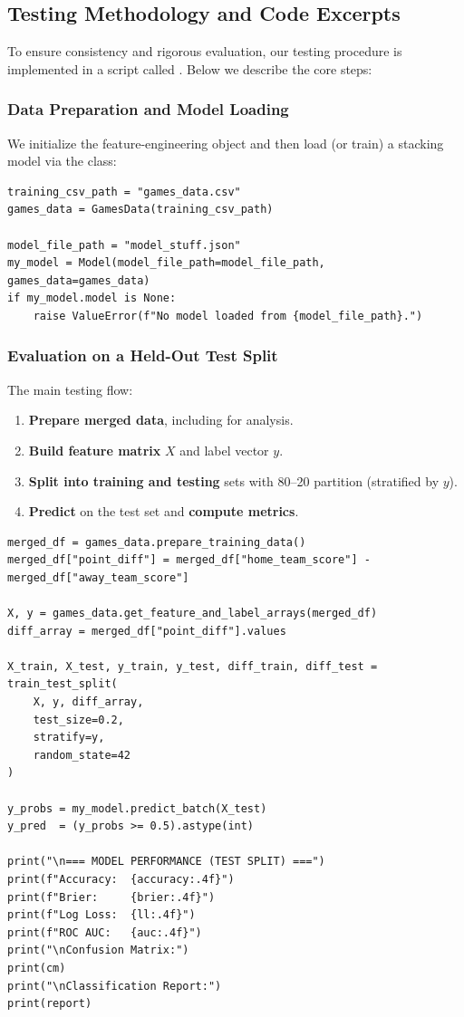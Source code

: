 \documentclass[12pt]{article}
\begin{document}
\subsection{Testing Methodology and Code Excerpts}
To ensure consistency and rigorous evaluation, our testing procedure is implemented in a script called . Below we describe the core steps:

\subsubsection{Data Preparation and Model Loading}
We initialize the feature-engineering object  and then load (or train) a stacking model via the  class:
\begin{verbatim}
training_csv_path = "games_data.csv"
games_data = GamesData(training_csv_path)

model_file_path = "model_stuff.json"
my_model = Model(model_file_path=model_file_path, games_data=games_data)
if my_model.model is None:
    raise ValueError(f"No model loaded from {model_file_path}.")
\end{verbatim}

\subsubsection{Evaluation on a Held-Out Test Split}
The main testing flow:
\begin{enumerate}[label=\arabic*)]
    \item \textbf{Prepare merged data}, including  for analysis.
    \item \textbf{Build feature matrix} \(X\) and label vector \(y\).
    \item \textbf{Split into training and testing} sets with 80--20 partition (stratified by \(y\)).
    \item \textbf{Predict} on the test set and \textbf{compute metrics}.
\end{enumerate}

\begin{verbatim}
merged_df = games_data.prepare_training_data()
merged_df["point_diff"] = merged_df["home_team_score"] - merged_df["away_team_score"]

X, y = games_data.get_feature_and_label_arrays(merged_df)
diff_array = merged_df["point_diff"].values

X_train, X_test, y_train, y_test, diff_train, diff_test = train_test_split(
    X, y, diff_array,
    test_size=0.2,
    stratify=y,
    random_state=42
)

y_probs = my_model.predict_batch(X_test)
y_pred  = (y_probs >= 0.5).astype(int)

print("\n=== MODEL PERFORMANCE (TEST SPLIT) ===")
print(f"Accuracy:  {accuracy:.4f}")
print(f"Brier:     {brier:.4f}")
print(f"Log Loss:  {ll:.4f}")
print(f"ROC AUC:   {auc:.4f}")
print("\nConfusion Matrix:")
print(cm)
print("\nClassification Report:")
print(report)
\end{verbatim}
\end{document}
